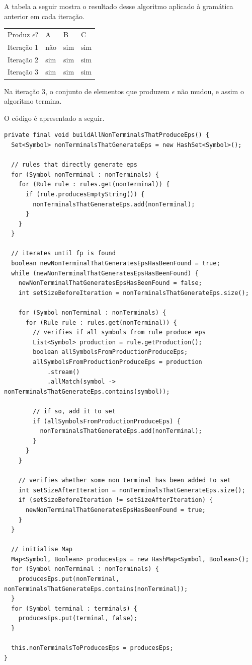 \documentclass[11pt]{article}
\begin{document}
A tabela a seguir mostra o resultado desse algoritmo aplicado à gramática
anterior em cada iteração.

\begin{center}
\begin{tabular}{llll}
Produz \(\epsilon\)? & A & B & C\\
Iteração 1 & não & sim & sim\\
Iteração 2 & sim & sim & sim\\
Iteração 3 & sim & sim & sim\\
\end{tabular}
\end{center}

Na iteração 3, o conjunto de elementos que produzem \(\epsilon\) não mudou, e assim
o algoritmo termina.

O código é apresentado a seguir.

\begin{verbatim}
private final void buildAllNonTerminalsThatProduceEps() {
  Set<Symbol> nonTerminalsThatGenerateEps = new HashSet<Symbol>();

  // rules that directly generate eps
  for (Symbol nonTerminal : nonTerminals) {
    for (Rule rule : rules.get(nonTerminal)) {
      if (rule.producesEmptyString()) {
        nonTerminalsThatGenerateEps.add(nonTerminal);
      }
    }
  }

  // iterates until fp is found
  boolean newNonTerminalThatGeneratesEpsHasBeenFound = true;
  while (newNonTerminalThatGeneratesEpsHasBeenFound) {
    newNonTerminalThatGeneratesEpsHasBeenFound = false;
    int setSizeBeforeIteration = nonTerminalsThatGenerateEps.size();

    for (Symbol nonTerminal : nonTerminals) {
      for (Rule rule : rules.get(nonTerminal)) {
        // verifies if all symbols from rule produce eps
        List<Symbol> production = rule.getProduction();
        boolean allSymbolsFromProductionProduceEps;
        allSymbolsFromProductionProduceEps = production
            .stream()
            .allMatch(symbol -> nonTerminalsThatGenerateEps.contains(symbol));

        // if so, add it to set
        if (allSymbolsFromProductionProduceEps) {
          nonTerminalsThatGenerateEps.add(nonTerminal);
        }
      }
    }

    // verifies whether some non terminal has been added to set
    int setSizeAfterIteration = nonTerminalsThatGenerateEps.size();
    if (setSizeBeforeIteration != setSizeAfterIteration) {
      newNonTerminalThatGeneratesEpsHasBeenFound = true;
    }
  }

  // initialise Map
  Map<Symbol, Boolean> producesEps = new HashMap<Symbol, Boolean>();
  for (Symbol nonTerminal : nonTerminals) {
    producesEps.put(nonTerminal, nonTerminalsThatGenerateEps.contains(nonTerminal));
  }
  for (Symbol terminal : terminals) {
    producesEps.put(terminal, false);
  }

  this.nonTerminalsToProducesEps = producesEps;
}
\end{verbatim}
\end{document}
